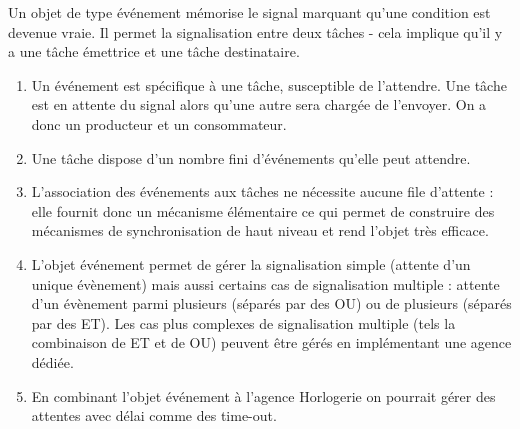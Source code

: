 {
Un objet de type événement mémorise le signal marquant qu'une condition 
est devenue vraie. Il permet la signalisation entre deux tâches - cela 
implique qu'il y a une tâche émettrice et une tâche destinataire. 
}

{
\begin{enumerate}
   \item Un événement est spécifique à une tâche, susceptible de l'attendre.
   Une tâche est en attente du signal alors qu'une autre sera chargée de l'envoyer. 
   On a donc un producteur et un consommateur.
   \item Une tâche dispose d'un nombre fini d'événements qu'elle peut
   attendre.
   \item L'association des événements aux tâches ne nécessite aucune file
   d'attente : elle fournit donc un mécanisme élémentaire ce qui permet de 
   construire des mécanismes de synchronisation de haut niveau et rend l'objet très efficace.
   \item L'objet événement permet de gérer la signalisation simple (attente
   d'un unique évènement) mais aussi certains cas de signalisation multiple : attente d'un évènement 
   parmi plusieurs (séparés par des OU) ou de plusieurs (séparés par des ET). 
   Les cas plus complexes de signalisation multiple (tels la combinaison de ET
   et de OU) peuvent être gérés en implémentant une agence dédiée.
   \item En combinant l'objet événement à l'agence Horlogerie on pourrait
   gérer des attentes avec délai comme des time-out.
\end{enumerate}
}
